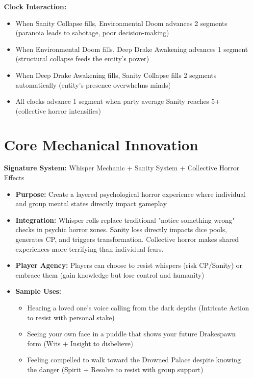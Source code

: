 \documentclass[11pt]{article}
\begin{document}
\textbf{Clock Interaction:}
\begin{itemize}
\item When Sanity Collapse fills, Environmental Doom advances 2 segments (paranoia leads to sabotage, poor decision-making)
\item When Environmental Doom fills, Deep Drake Awakening advances 1 segment (structural collapse feeds the entity's power)
\item When Deep Drake Awakening fills, Sanity Collapse fills 2 segments automatically (entity's presence overwhelms minds)
\item All clocks advance 1 segment when party average Sanity reaches 5+ (collective horror intensifies)
\end{itemize}

\section{Core Mechanical Innovation}

\textbf{Signature System:} Whisper Mechanic + Sanity System + Collective Horror Effects
\begin{itemize}
\item \textbf{Purpose:} Create a layered psychological horror experience where individual and group mental states directly impact gameplay
\item \textbf{Integration:} Whisper rolls replace traditional "notice something wrong" checks in psychic horror zones. Sanity loss directly impacts dice pools, generates CP, and triggers transformation. Collective horror makes shared experiences more terrifying than individual fears.
\item \textbf{Player Agency:} Players can choose to resist whispers (risk CP/Sanity) or embrace them (gain knowledge but lose control and humanity)
\item \textbf{Sample Uses:}
  \begin{itemize}
  \item Hearing a loved one's voice calling from the dark depths (Intricate Action to resist with personal stake)
  \item Seeing your own face in a puddle that shows your future Drakespawn form (Wits + Insight to disbelieve)
  \item Feeling compelled to walk toward the Drowned Palace despite knowing the danger (Spirit + Resolve to resist with group support)
  \end{itemize}
\end{itemize}
\end{document}
